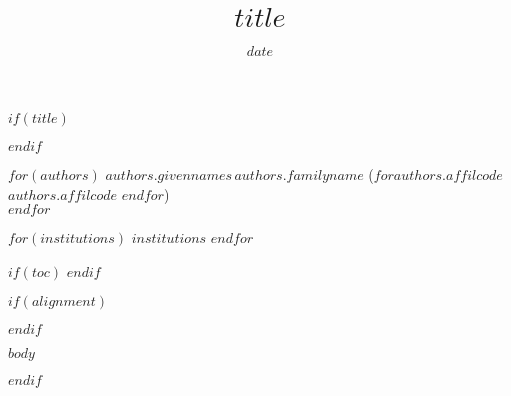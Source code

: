 \documentclass[11pt]{scrartcl}
\title{$title$}
\date{$date$}
\begin{document}
$if(title)$
\maketitle
$endif$

{\small
$for(authors)$
\textsc{$authors.givennames$\,$authors.familyname$} ($for {authors.affilcode}$ $authors.affilcode$ $endfor$)\\
$endfor$
}

{\small
$for(institutions)$
$institutions$
$endfor$
}

$if(toc)$
\tableofcontents
$endif$


$if(alignment)$
\begin{$alignment$}
$endif$

\clearpage

$body$

\end{$alignment$}
$endif$
\end{document}

